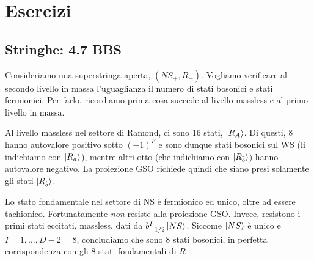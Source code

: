 \documentclass{report}
\begin{document}

\chapter{Esercizi}

\section{Stringhe: 4.7 BBS}

Consideriamo una superstringa aperta, \((NS_+, R_-)\). Vogliamo verificare al secondo livello in massa l'uguaglianza il numero di stati bosonici e stati fermionici. Per farlo, ricordiamo prima cosa succede al livello massless e al primo livello in massa. 

Al livello massless nel settore di Ramond, ci sono 16 stati, \(\ket{R_A}\). Di questi, 8 hanno autovalore positivo sotto \((-1)^F\) e sono dunque stati bosonici sul WS (li indichiamo con \(\ket{R_a}\)), mentre altri otto (che indichiamo con \(\ket{R_{\bar{b}}}\)) hanno autovalore negativo. La proiezione GSO richiede quindi che siano presi solamente gli stati \(\ket{R_{\hat{b}}}\). 

Lo stato fondamentale nel settore di NS è fermionico ed unico, oltre ad essere tachionico. Fortunatamente \emph{non} resiste alla proiezione GSO. Invece, resistono i primi stati eccitati, massless, dati da \(b_{-1/2}^I\ket{NS}\). Siccome \(\ket{NS}\) è unico e \(I = 1, \ldots, D-2 = 8\), concludiamo che sono 8 stati bosonici, in perfetta corrispondenza con gli 8 stati fondamentali di \(R_-\). 
\end{document}

